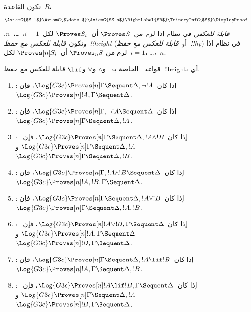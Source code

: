 \documentclass[../../../include/open-logic-section]{subfiles}
\begin{document}


\begin{defn}
تكون القاعدة~$R$،
\[
\AxiomC{$S_1$}
\AxiomC{$\dots$}
\AxiomC{$S_n$}
\RightLabel{$R$}
\TrinaryInfC{$S$}
\DisplayProof
\]
\emph{قابلة للعكس} في نظام إذا لزم من~$\Proves S$ أن~$\Proves S_i$
لكل~$i=1$، \dots،~$n$. وتكون~\emph{قابلة للعكس مع حفظ~!!{height}}
(أو~\emph{قابلة للعكس مع حفظ~!!{hp}}) في نظام إذا لزم من
$\Proves_n S$ أن~$\Proves[n] S_i$ لكل~$i=1$، \dots،~$n$.
\end{defn}

\begin{lem}
قواعد~ الخاصة بـ$\lnot$ و$\land$ و$\lor$ و$\lif$ قابلة للعكس مع
حفظ~!!{height}، أي:
\begin{enumerate}
  \item \RightR{\lnot}: إذا كان~$\Log{G3c} \Proves[n] \Gamma \Sequent
  \Delta, \lnot !A$، فإن~$\Log{G3c} \Proves[n] !A, \Gamma \Sequent
  \Delta$.
  \item \LeftR{\lnot}: إذا كان~$\Log{G3c} \Proves[n] \Gamma, \lnot !A
  \Sequent \Delta$، فإن~$\Log{G3c} \Proves[n] \Gamma \Sequent \Delta,
  !A$.
  \item \RightR{\land}: إذا كان~$\Log{G3c} \Proves[n] \Gamma \Sequent
  \Delta, !A \land !B$، فإن~$\Log{G3c} \Proves[n] \Gamma \Sequent
  \Delta, !A$ و$\Log{G3c} \Proves[n] \Gamma \Sequent
  \Delta, !B$.
  \item \LeftR{\land}: إذا كان~$\Log{G3c} \Proves[n] \Gamma, !A \land !B
  \Sequent \Delta$، فإن~$\Log{G3c} \Proves[n] !A, !B, \Gamma \Sequent
  \Delta$.
  \item \RightR{\lor}: إذا كان~$\Log{G3c} \Proves[n] \Gamma \Sequent
  \Delta, !A \lor !B$، فإن~$\Log{G3c} \Proves[n] \Gamma \Sequent
  \Delta, !A, !B$.
  \item \LeftR{\lor}: إذا كان~$\Log{G3c} \Proves[n] !A \lor !B, \Gamma \Sequent
  \Delta$، فإن~$\Log{G3c} \Proves[n] !A, \Gamma \Sequent
  \Delta$ و$\Log{G3c} \Proves[n] !B, \Gamma \Sequent
  \Delta$.
  \item \RightR{\lif}: إذا كان~$\Log{G3c} \Proves[n] \Gamma \Sequent
  \Delta, !A \lif !B$، فإن~$\Log{G3c} \Proves[n] !A, \Gamma \Sequent
  \Delta, !B$.
  \item \LeftR{\lif}: إذا كان~$\Log{G3c} \Proves[n] !A \lif !B, \Gamma
  \Sequent \Delta$، فإن~$\Log{G3c} \Proves[n] \Gamma \Sequent \Delta,
  !A$ و$\Log{G3c} \Proves[n] !B, \Gamma \Sequent \Delta$.
\end{enumerate}
\end{lem}
\end{document}
